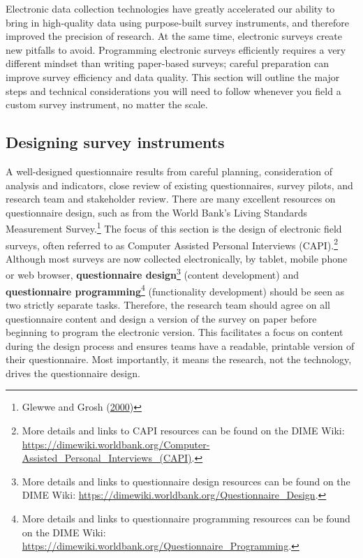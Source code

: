 \documentclass[
]{book}
\begin{document}
Electronic data collection technologies
have greatly accelerated our ability to bring in high-quality data
using purpose-built survey instruments,
and therefore improved the precision of research.
At the same time, electronic surveys create new pitfalls to avoid.
Programming electronic surveys efficiently requires a very different mindset
than writing paper-based surveys;
careful preparation can improve survey efficiency and data quality.
This section will outline the major steps and technical considerations
you will need to follow whenever you field a custom survey instrument,
no matter the scale.

\hypertarget{designing-survey-instruments}{%
\subsection*{Designing survey instruments}\label{designing-survey-instruments}}

A well-designed questionnaire results from careful planning,
consideration of analysis and indicators,
close review of existing questionnaires,
survey pilots, and research team and stakeholder review.
There are many excellent resources on questionnaire design,
such as from the World Bank's Living Standards Measurement Survey.\footnote{Glewwe and Grosh (\protect\hyperlink{ref-glewwe2000designing}{2000})}
The focus of this section is the design of electronic field surveys,
often referred to as Computer Assisted Personal Interviews (CAPI).\footnote{More details and links to CAPI resources can be found on the DIME Wiki:
  \url{https://dimewiki.worldbank.org/Computer-Assisted_Personal_Interviews_(CAPI)}.}
Although most surveys are now collected electronically, by tablet, mobile phone or web browser,
\textbf{questionnaire design}\footnote{More details and links to questionnaire design resources
  can be found on the DIME Wiki:
  \url{https://dimewiki.worldbank.org/Questionnaire_Design}.}
(content development) and \textbf{questionnaire programming}\footnote{More details and links to questionnaire programming resources
  can be found on the DIME Wiki:
  \url{https://dimewiki.worldbank.org/Questionnaire_Programming}.}
(functionality development) should be seen as two strictly separate tasks.
Therefore, the research team should agree on all questionnaire content
and design a version of the survey on paper
before beginning to program the electronic version.
This facilitates a focus on content during the design process
and ensures teams have a readable, printable version of their questionnaire.
Most importantly, it means the research, not the technology,
drives the questionnaire design.
\end{document}
